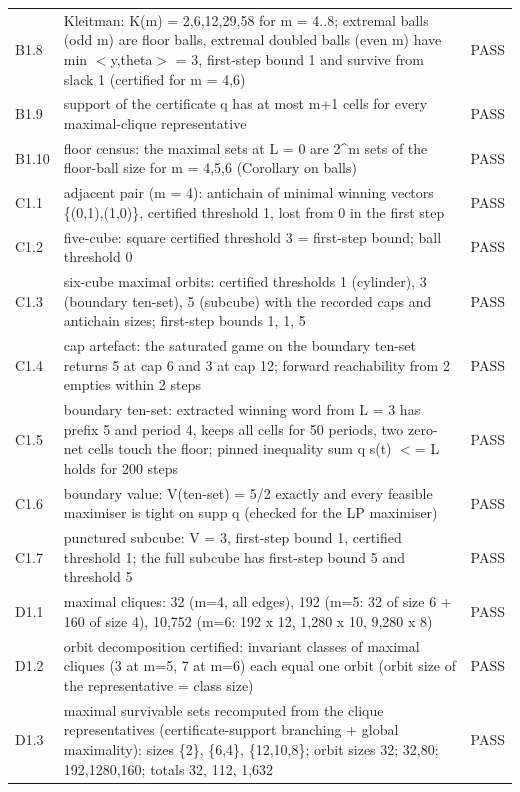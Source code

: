 \begin{longtable}{@{}l p{} l@{}}
B1.8 & Kleitman: K(m) = 2,6,12,29,58 for m = 4..8; extremal balls (odd m) are floor balls, extremal doubled balls (even m) have min $<$y,theta$>$ = 3, first-step bound 1 and survive from slack 1 (certified for m = 4,6) & PASS\\
B1.9 & support of the certificate q has at most m+1 cells for every maximal-clique representative & PASS\\
B1.10 & floor census: the maximal sets at L = 0 are 2\^{}m sets of the floor-ball size for m = 4,5,6 (Corollary on balls) & PASS\\
C1.1 & adjacent pair (m = 4): antichain of minimal winning vectors \{(0,1),(1,0)\}, certified threshold 1, lost from 0 in the first step & PASS\\
C1.2 & five-cube: square certified threshold 3 = first-step bound; ball threshold 0 & PASS\\
C1.3 & six-cube maximal orbits: certified thresholds 1 (cylinder), 3 (boundary ten-set), 5 (subcube) with the recorded caps and antichain sizes; first-step bounds 1, 1, 5 & PASS\\
C1.4 & cap artefact: the saturated game on the boundary ten-set returns 5 at cap 6 and 3 at cap 12; forward reachability from 2 empties within 2 steps & PASS\\
C1.5 & boundary ten-set: extracted winning word from L = 3 has prefix 5 and period 4, keeps all cells for 50 periods, two zero-net cells touch the floor; pinned inequality sum q s(t) $<$= L holds for 200 steps & PASS\\
C1.6 & boundary value: V(ten-set) = 5/2 exactly and every feasible maximiser is tight on supp q (checked for the LP maximiser) & PASS\\
C1.7 & punctured subcube: V = 3, first-step bound 1, certified threshold 1; the full subcube has first-step bound 5 and threshold 5 & PASS\\
D1.1 & maximal cliques: 32 (m=4, all edges), 192 (m=5: 32 of size 6 + 160 of size 4), 10,752 (m=6: 192 x 12, 1,280 x 10, 9,280 x 8) & PASS\\
D1.2 & orbit decomposition certified: invariant classes of maximal cliques (3 at m=5, 7 at m=6) each equal one orbit (orbit size of the representative = class size) & PASS\\
D1.3 & maximal survivable sets recomputed from the clique representatives (certificate-support branching + global maximality): sizes \{2\}, \{6,4\}, \{12,10,8\}; orbit sizes 32; 32,80; 192,1280,160; totals 32, 112, 1,632 & PASS\\

\end{longtable}
